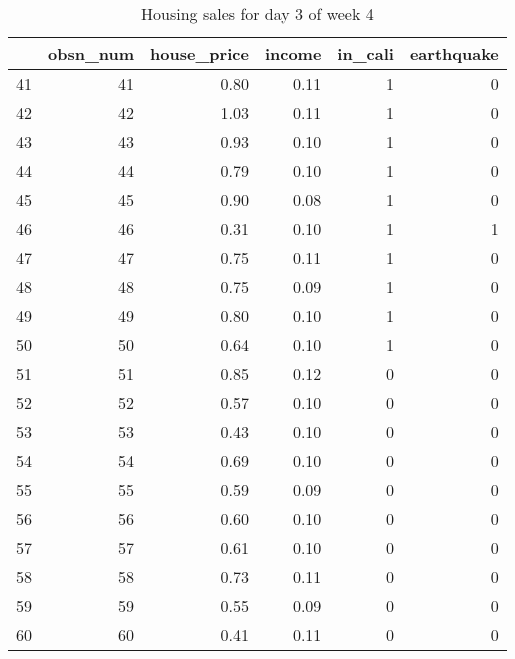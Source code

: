\begin{table}[ht]
\centering
\begin{tabular}{rrrrrr}
  \hline
 & obsn\_num & house\_price & income & in\_cali & earthquake \\ 
  \hline
41 &  41 & 0.80 & 0.11 &   1 &   0 \\ 
  42 &  42 & 1.03 & 0.11 &   1 &   0 \\ 
  43 &  43 & 0.93 & 0.10 &   1 &   0 \\ 
  44 &  44 & 0.79 & 0.10 &   1 &   0 \\ 
  45 &  45 & 0.90 & 0.08 &   1 &   0 \\ 
  46 &  46 & 0.31 & 0.10 &   1 &   1 \\ 
  47 &  47 & 0.75 & 0.11 &   1 &   0 \\ 
  48 &  48 & 0.75 & 0.09 &   1 &   0 \\ 
  49 &  49 & 0.80 & 0.10 &   1 &   0 \\ 
  50 &  50 & 0.64 & 0.10 &   1 &   0 \\ 
  51 &  51 & 0.85 & 0.12 &   0 &   0 \\ 
  52 &  52 & 0.57 & 0.10 &   0 &   0 \\ 
  53 &  53 & 0.43 & 0.10 &   0 &   0 \\ 
  54 &  54 & 0.69 & 0.10 &   0 &   0 \\ 
  55 &  55 & 0.59 & 0.09 &   0 &   0 \\ 
  56 &  56 & 0.60 & 0.10 &   0 &   0 \\ 
  57 &  57 & 0.61 & 0.10 &   0 &   0 \\ 
  58 &  58 & 0.73 & 0.11 &   0 &   0 \\ 
  59 &  59 & 0.55 & 0.09 &   0 &   0 \\ 
  60 &  60 & 0.41 & 0.11 &   0 &   0 \\ 
   \hline
\end{tabular}
\caption{Housing sales for day 3 of week 4} 
\end{table}
